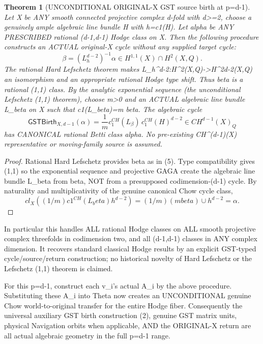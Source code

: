 \documentclass[11pt]{article}
\newtheorem{theorem}{Theorem}
\begin{document}
\begin{theorem}[UNCONDITIONAL ORIGINAL-X GST source birth at p=d-1]
Let X be ANY smooth connected projective
complex d-fold with d>=2, choose a genuinely
ample algebraic line bundle H with
h=c1(H). Let alpha be ANY PRESCRIBED
rational (d-1,d-1) Hodge class on X.
Then the following procedure constructs
an ACTUAL original-X cycle without
any supplied target cycle:
\[
\boxed{
\beta=(L_h^{d-2})^{-1}\alpha
\in H^{1,1}(X)\cap H^2(X,Q).
}\tag{5}
\]
The rational Hard Lefschetz theorem makes
L_h^{d-2}:H^2(X,Q)->H^{2d-2}(X,Q)
an isomorphism and an appropriate rational
Hodge type shift. Thus beta is a rational
(1,1) class. By the analytic exponential
sequence (the unconditional Lefschetz
(1,1) theorem), choose m>0 and an
ACTUAL algebraic line bundle L_beta on X
such that c1(L_beta)=m beta.
The algebraic cycle
\[
\boxed{
\mathsf{GSTBirth}_{X,d-1}(\alpha)
=\frac1m c_1^{CH}(L_\beta)
\,c_1^{CH}(H)^{d-2}
\in CH^{d-1}(X)_Q}\tag{6}
\]
has CANONICAL rational Betti class alpha.
No pre-existing CH^(d-1)(X) representative
or moving-family source is assumed.
\end{theorem}
\begin{proof}
Rational Hard Lefschetz provides beta
as in (5). Type compatibility gives
(1,1) so the exponential sequence and
projective GAGA create the algebraic line
bundle L_beta from beta, NOT from a
presupposed codimension-(d-1) cycle.
By naturality and multiplicativity of
the genuine canonical Chow cycle class,
\[
cl_X((1/m)c1^{CH}(L_beta)h^{d-2})
=(1/m)(m beta)\cup h^{d-2}
=\alpha.
\]
\end{proof}

In particular this handles ALL rational
Hodge classes on ALL smooth projective
complex threefolds in codimension two,
and all (d-1,d-1) classes in ANY complex
dimension. It recovers standard classical
Hodge results by an explicit GST-typed
cycle/source/return construction; no
historical novelty of Hard Lefschetz or
the Lefschetz (1,1) theorem is claimed.

For this p=d-1, construct each v_i's actual
A_i by the above procedure. Substituting
these A_i into Theta now creates an
UNCONDITIONAL genuine Chow world-to-original
transfer for the entire Hodge fiber.
Consequently the universal auxiliary GST
birth construction (2), genuine GST
matrix units, physical Navigation orbits
when applicable, AND the ORIGINAL-X
return are all actual algebraic geometry
in the full p=d-1 range.
\end{document}
